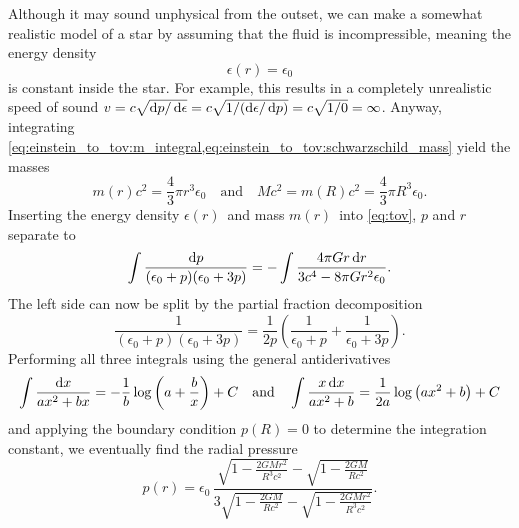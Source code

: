 Although it may sound unphysical from the outset, we can make a somewhat realistic model of a star by assuming that the fluid is incompressible, meaning the energy density
\begin{equation}
	\epsilon(r) = \epsilon_0
\end{equation}
is constant inside the star.
For example, this results in a completely unrealistic speed of sound $v = c \sqrt{\mathop{}\!\mathrm{d} p / \mathop{}\!\mathrm{d} \epsilon} = c \sqrt{1/(\mathop{}\!\mathrm{d} \epsilon / \mathop{}\!\mathrm{d} p)} = c \sqrt{1/0} = \infty$. \cite{ref:speed_of_sound}
Anyway, integrating \cref{eq:einstein_to_tov:m_integral,eq:einstein_to_tov:schwarzschild_mass} yield the masses
\begin{equation}
	m(r) c^2 = \frac{4}{3} \pi r^3 \epsilon_0 
	\quad \text{and} \quad
	M c^2 = m(R) c^2 = \frac{4}{3} \pi R^3 \epsilon_0 
	.
\end{equation}
Inserting the energy density $\epsilon(r)$ and mass $m(r)$ into \cref{eq:tov}, $p$ and $r$ separate to
\begin{equation*}
	\int \frac{\mathop{}\!\mathrm{d} p}{(\epsilon_0+p)(\epsilon_0+3p)} = - \int \frac{4 \pi G r \mathop{}\!\mathrm{d} r}{3 c^4 - 8\pi G r^2 \epsilon_0} .
\end{equation*}
The left side can now be split by the partial fraction decomposition
\begin{equation*}
	\frac{1}{(\epsilon_0+p)(\epsilon_0+3p)} = \frac{1}{2p} \left( \frac{1}{\epsilon_0+p} + \frac{1}{\epsilon_0+3p} \right) .
\end{equation*}
Performing all three integrals using the general antiderivatives
\begin{equation*}
	\int \frac{\mathop{}\!\mathrm{d} x}{a x^2 + b x} = -\frac{1}{b} \log \left( a + \frac{b}{x} \right) + C
	\quad \text{and} \quad
	\int \frac{x \mathop{}\!\mathrm{d} x}{a x^2 + b} = \frac{1}{2 a} \log \left( a x^2 + b \right) + C
\end{equation*}
and applying the boundary condition $p(R) = 0$ to determine the integration constant, we eventually find the radial pressure
\begin{equation}
	p(r) = \epsilon_0 \, \frac{\sqrt{1-\frac{2GMr^2}{R^3c^2}} - \sqrt{1-\frac{2GM}{Rc^2}}}{3 \sqrt{1-\frac{2GM}{Rc^2}} - \sqrt{1-\frac{2GMr^2}{R^3c^2}}} .
	\label{eq:incompressible_star:pressure}
\end{equation}
